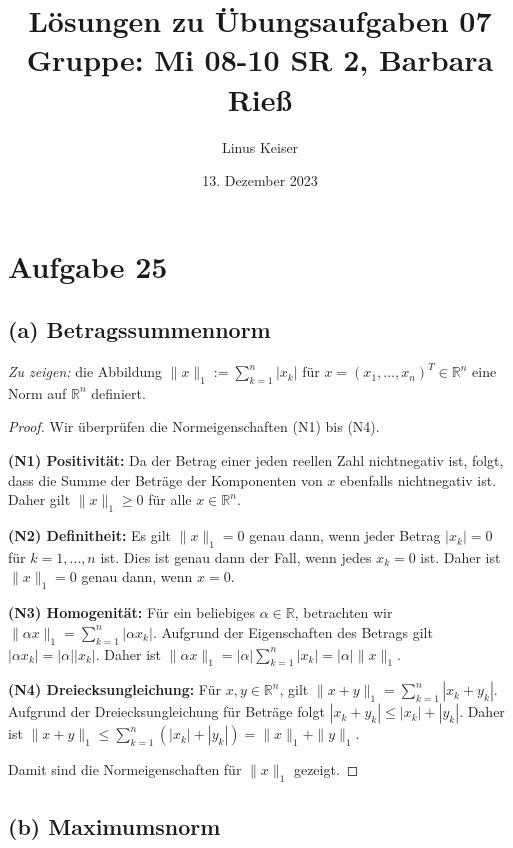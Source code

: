 \documentclass{article}
\title{Lösungen zu Übungsaufgaben 07 \\ \small Gruppe: Mi 08-10 SR 2, Barbara Rieß}
\author{Linus Keiser}
\date{13. Dezember 2023}
\theoremstyle{definition}
\theoremstyle{remark}
\begin{document}
\graphicspath{ {./ } }

\maketitle
\section*{Aufgabe 25}

\subsection*{(a) Betragssummennorm}

\textit{Zu zeigen:} die Abbildung \( \| x \|_1 := \sum_{k=1}^{n} |x_k| \) für \( x = (x_1, \ldots, x_n)^T \in \mathbb{R}^n \) eine Norm auf \( \mathbb{R}^n \) definiert.

\begin{proof} Wir überprüfen die Normeigenschaften (N1) bis (N4).

    \textbf{(N1) Positivität:}
    Da der Betrag einer jeden reellen Zahl nichtnegativ ist, folgt, dass die Summe der Beträge der Komponenten von \( x \) ebenfalls nichtnegativ ist. Daher gilt \( \| x \|_1 \geq 0 \) für alle \( x \in \mathbb{R}^n \).

    \textbf{(N2) Definitheit:}
    Es gilt \( \| x \|_1 = 0 \) genau dann, wenn jeder Betrag \( |x_k| = 0 \) für \( k = 1, \ldots, n \) ist. Dies ist genau dann der Fall, wenn jedes \( x_k = 0 \) ist. Daher ist \( \| x \|_1 = 0 \) genau dann, wenn \( x = 0 \).

    \textbf{(N3) Homogenität:}
    Für ein beliebiges \( \alpha \in \mathbb{R} \), betrachten wir \( \| \alpha x \|_1 = \sum_{k=1}^{n} |\alpha x_k| \). Aufgrund der Eigenschaften des Betrags gilt \( |\alpha x_k| = |\alpha||x_k| \). Daher ist \( \| \alpha x \|_1 = |\alpha| \sum_{k=1}^{n} |x_k| = |\alpha| \| x \|_1 \).

    \textbf{(N4) Dreiecksungleichung:}
    Für \( x, y \in \mathbb{R}^n \), gilt \( \| x + y \|_1 = \sum_{k=1}^{n} |x_k + y_k| \). Aufgrund der Dreiecksungleichung für Beträge folgt \( |x_k + y_k| \leq |x_k| + |y_k| \). Daher ist \( \| x + y \|_1 \leq \sum_{k=1}^{n} (|x_k| + |y_k|) = \| x \|_1 + \| y \|_1 \).

    Damit sind die Normeigenschaften für \( \| x \|_1 \) gezeigt.
\end{proof}

\subsection*{(b) Maximumsnorm}
\end{document}
